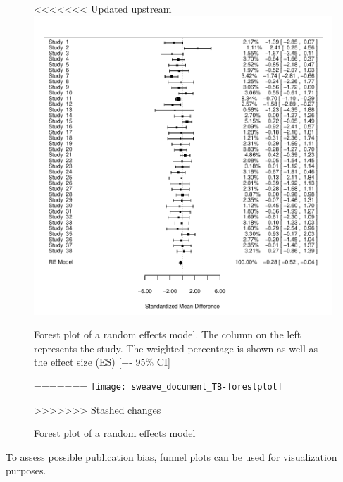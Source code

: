 \documentclass[11pt, a4paper]{article} %
\begin{document}
\begin{figure}
\captionsetup{width=0.6\textwidth}
\centering
<<<<<<< Updated upstream
\includegraphics{sweave_document_TB-forest_re}

\caption{Forest plot of a random effects model. The column on the left represents the study. The weighted percentage is shown as well as the effect size (ES) [+- 95\% CI]}
=======
\texttt{[image: sweave\_document\_TB-forestplot]}
\caption{Forest plot of a random effects model}
>>>>>>> Stashed changes
\end{figure}


To assess possible publication bias, funnel plots can be used for visualization purposes.
\end{document}

